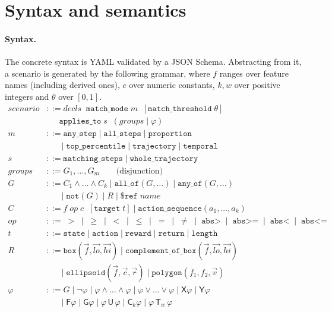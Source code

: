 \documentclass{article}
\begin{document}



\appendix

\section{Syntax and semantics}
\label{app:formal}

\paragraph{Syntax.} The concrete syntax is YAML validated by a JSON
Schema. Abstracting from it, a scenario is generated by the following
grammar, where $f$ ranges over feature names (including derived ones),
$c$ over numeric constants, $k,w$ over positive integers and $\theta$ over
$[0,1]$.
\begin{align*}
\mathit{scenario} &::= \mathit{decls}\;\; \texttt{match\_mode}\;m\;\;[\texttt{match\_threshold}\;\theta]\\
&\quad\;\;\texttt{applies\_to}\;s\;\;(\mathit{groups}\mid\varphi)\\
m &::= \texttt{any\_step}\mid\texttt{all\_steps}\mid\texttt{proportion}\\
&\quad\;\;\mid\texttt{top\_percentile}\mid\texttt{trajectory}\mid\texttt{temporal}\\
s &::= \texttt{matching\_steps}\mid\texttt{whole\_trajectory}\\
\mathit{groups} &::= G_1,\dots,G_m \qquad\text{(disjunction)}\\
G &::= C_1\wedge\dots\wedge C_k \mid \texttt{all\_of}(G,\dots)\mid\texttt{any\_of}(G,\dots)\\
&\quad\;\;\mid\texttt{not}(G)\mid R\mid\texttt{\$ref}\;\mathit{name}\\
C &::= f\;\mathit{op}\;c \;\;[\texttt{target}\;t] \mid \texttt{action\_sequence}(a_1,\dots,a_k)\\
\mathit{op} &::= \;>\;\mid\;\ge\;\mid\;<\;\mid\;\le\;\mid\;=\;\mid\;\ne\;\mid\;\texttt{abs>}\;\mid\;\texttt{abs>=}\;\mid\;\texttt{abs<}\;\mid\;\texttt{abs<=}\\
t &::= \texttt{state}\mid\texttt{action}\mid\texttt{reward}\mid\texttt{return}\mid\texttt{length}\\
R &::= \texttt{box}(\vec f,\vec{lo},\vec{hi})\mid\texttt{complement\_of\_box}(\vec f,\vec{lo},\vec{hi})\\
&\quad\;\;\mid\texttt{ellipsoid}(\vec f,\vec c,\vec r)\mid\texttt{polygon}(f_1,f_2,\vec v)\\
\varphi &::= G\mid\neg\varphi\mid\varphi\wedge\dots\wedge\varphi\mid\varphi\vee\dots\vee\varphi\mid\mathsf{X}\varphi\mid\mathsf{Y}\varphi\\
&\quad\;\;\mid\mathsf{F}\varphi\mid\mathsf{G}\varphi\mid\varphi\,\mathsf{U}\,\varphi\mid\mathsf{C}_k\varphi\mid\varphi\,\mathsf{T}_w\,\varphi
\end{align*}
\end{document}
